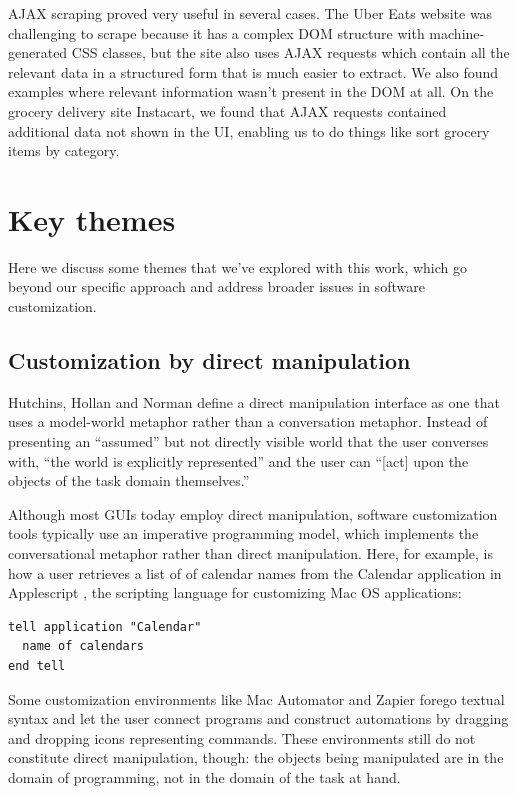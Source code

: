 \documentclass[sigplan,screen,10pt,anonymous,review]{acmart}
\begin{document}
AJAX scraping proved very useful in several cases. The Uber Eats website
was challenging to scrape because it has a complex DOM structure with
machine-generated CSS classes, but the site also uses AJAX requests
which contain all the relevant data in a structured form that is much
easier to extract. We also found examples where relevant information
wasn't present in the DOM at all. On the grocery delivery site
Instacart, we found that AJAX requests contained additional data not
shown in the UI, enabling us to do things like sort grocery items by
category.

\hypertarget{sec:themes}{%
\section{Key themes}\label{sec:themes}}

Here we discuss some themes that we've explored with this work, which go
beyond our specific approach and address broader issues in software
customization.

\hypertarget{sec:dm}{%
\subsection{Customization by direct manipulation}\label{sec:dm}}

Hutchins, Hollan and Norman \citep{hutchins1985} define a direct
manipulation interface as one that uses a model-world metaphor rather
than a conversation metaphor. Instead of presenting an ``assumed'' but
not directly visible world that the user converses with, ``the world is
explicitly represented'' and the user can ``{[}act{]} upon the objects
of the task domain themselves.''

Although most GUIs today employ direct manipulation, software
customization tools typically use an imperative programming model, which
implements the conversational metaphor rather than direct manipulation.
Here, for example, is how a user retrieves a list of of calendar names
from the Calendar application in Applescript \citep{cook2007}, the
scripting language for customizing Mac OS applications:

\begin{verbatim}
tell application "Calendar"
  name of calendars
end tell
\end{verbatim}

Some customization environments like Mac Automator and Zapier forego
textual syntax and let the user connect programs and construct
automations by dragging and dropping icons representing commands. These
environments still do not constitute direct manipulation, though: the
objects being manipulated are in the domain of programming, not in the
domain of the task at hand.
\end{document}
